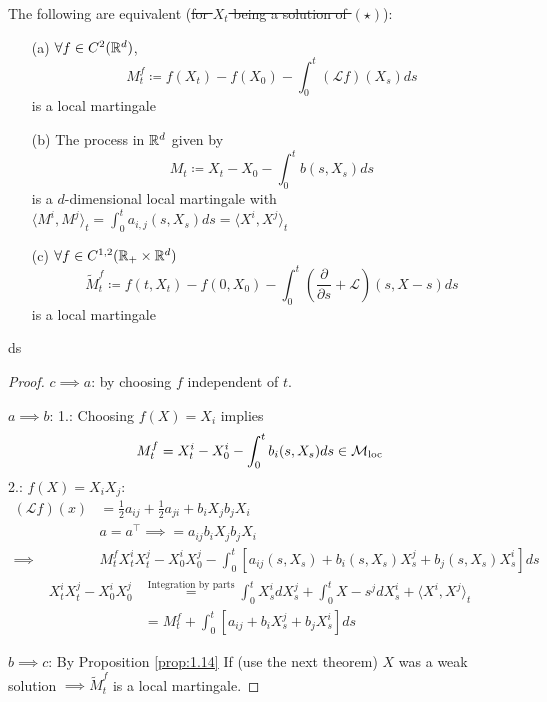 \begin{theorem}\label{thm:1.19}
    The following are equivalent (\st{for $X_t$ being a solution of $(\star)$}):
    \begin{enumerate}
        \item[(a)] $\forall f\in C^2(\mathbb{R}^d)$, \[M_t^f\coloneqq f(X_t)-f(X_0)-\int_0^t(\mathcal{L}f)(X_s)ds\] is a local martingale 
        \item[(b)] The process in $\mathbb{R}^d$ given by \[M_t\coloneqq X_t-X_0-\int_0^t b(s,X_s)ds\] is a $d$-dimensional local martingale with $\langle M^i,M^j\rangle_t=\int_0^t a_{i,j}(s,X_s)ds=\langle X^i,X^j\rangle_t$ 
        \item[(c)] $\forall f\in C^{1,2}(\mathbb{R}_+\times \mathbb{R}^d)$ \[\tilde{M}_t^f\coloneqq f(t,X_t)-f(0,X_0)-\int_0^t\left(\frac{\partial}{\partial s}+\mathcal{L}\right)(s,X-s)ds\] is a local martingale  
    \end{enumerate}ds
\end{theorem}

\begin{proof}
    \underline{$c\implies a$}: by choosing $f$ independent of $t$.

    \underline{$ a \implies b$}: 1.: Choosing $f(X)=X_i$ implies 
    \begin{align*}
        M_t^f=X_t^i-X_0^i-\int_0^t b_i(s,X_s)ds\in\mathcal{M}_{\text{loc}}
    \end{align*}
    2.: $f(X)=X_iX_j$: 
    \begin{align*}
        (\mathcal{L}f)(x)&=\frac{1}{2}a_{ij}+\frac{1}{2}a_{ji}+b_iX_j b_jX_i\\
        &a=a^\intercal\implies =a_{ij} b_iX_j b_j X_i\\
        \implies& M_t^f X_t^i X_t^j-X_0^iX_0^j-\int_0^t\left[a_{ij}(s,X_s)+b_i(s,X_s)X_s^j+b_j(s,X_s)X_s^i\right]ds
    \end{align*}
    \begin{align*}
        X_t^iX_t^j-X_0^iX_0^j&\stackrel{\text{Integration by parts}}{=}\int_0^t X_s^i dX_s^j+\int_0^t X-s^j dX_s^i + \langle X^i,X^j\rangle_t\\
        &= M_t^f+\int_0^t [a_{ij}+b_iX_s^j+b_jX_s^i] ds
    \end{align*}


    \underline{$b\implies c$}: By Proposition \ref{prop:1.14} If (use the next theorem) $X$ was a weak solution $\implies \tilde{M}_t^f$ is a local martingale. 
\end{proof}


